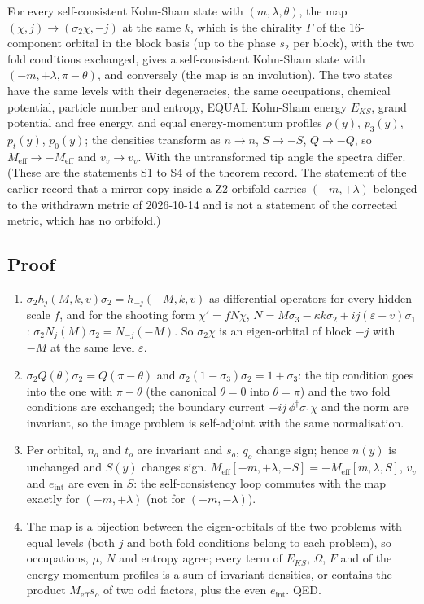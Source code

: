 \documentclass[11pt]{article}
\begin{document}
For every self-consistent Kohn-Sham state with $(m,\lambda,\theta)$, the map $(\chi, j) \to (\sigma_2\chi, -j)$ at the same $k$, which is the chirality $\Gamma$ of the 16-component orbital in the block basis (up to the phase $s_2$ per block), with the two fold conditions exchanged, gives a self-consistent Kohn-Sham state with $(-m,+\lambda,\pi-\theta)$, and conversely (the map is an involution). The two states have the same levels with their degeneracies, the same occupations, chemical potential, particle number and entropy, EQUAL Kohn-Sham energy $E_{KS}$, grand potential and free energy, and equal energy-momentum profiles $\rho(y)$, $p_3(y)$, $p_t(y)$, $p_0(y)$; the densities transform as $n \to n$, $S \to -S$, $Q \to -Q$, so $M_{\mathrm{eff}} \to -M_{\mathrm{eff}}$ and $v_v \to v_v$. With the untransformed tip angle the spectra differ. (These are the statements S1 to S4 of the theorem record. The statement of the earlier record that a mirror copy inside a Z2 orbifold carries $(-m,+\lambda)$ belonged to the withdrawn metric of 2026-10-14 and is not a statement of the corrected metric, which has no orbifold.)

\subsection{Proof}

\begin{enumerate}
\item $\sigma_2h_j(M,k,v)\sigma_2 = h_{-j}(-M,k,v)$ as differential operators for every hidden scale $f$, and for the shooting form $\chi' = fN\chi$, $N = M\sigma_3 - \kappa k\sigma_2 + ij(\varepsilon - v)\sigma_1$: $\sigma_2N_j(M)\sigma_2 = N_{-j}(-M)$. So $\sigma_2\chi$ is an eigen-orbital of block $-j$ with $-M$ at the same level $\varepsilon$.
\item $\sigma_2Q(\theta)\sigma_2 = Q(\pi - \theta)$ and $\sigma_2(1 - \sigma_3)\sigma_2 = 1 + \sigma_3$: the tip condition goes into the one with $\pi - \theta$ (the canonical $\theta = 0$ into $\theta = \pi$) and the two fold conditions are exchanged; the boundary current $-ij\,\phi^\dagger\sigma_1\chi$ and the norm are invariant, so the image problem is self-adjoint with the same normalisation.
\item Per orbital, $n_o$ and $t_o$ are invariant and $s_o$, $q_o$ change sign; hence $n(y)$ is unchanged and $S(y)$ changes sign. $M_{\mathrm{eff}}[-m,+\lambda,-S] = -M_{\mathrm{eff}}[m,\lambda,S]$, $v_v$ and $e_{\mathrm{int}}$ are even in $S$: the self-consistency loop commutes with the map exactly for $(-m,+\lambda)$ (not for $(-m,-\lambda)$).
\item The map is a bijection between the eigen-orbitals of the two problems with equal levels (both $j$ and both fold conditions belong to each problem), so occupations, $\mu$, $N$ and entropy agree; every term of $E_{KS}$, $\Omega$, $F$ and of the energy-momentum profiles is a sum of invariant densities, or contains the product $M_{\mathrm{eff}}s_o$ of two odd factors, plus the even $e_{\mathrm{int}}$. QED.
\end{enumerate}
\end{document}
